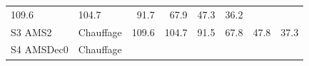 \documentclass[]{article}
\begin{document}
\begin{longtable}[]{@{}llrrrrrr@{}}
\begin{minipage}[t]{0.09\columnwidth}
109.6\strut
\end{minipage} & \begin{minipage}[t]{0.09\columnwidth}\raggedleft\strut
104.7\strut
\end{minipage} & \begin{minipage}[t]{0.09\columnwidth}\raggedleft\strut
91.7\strut
\end{minipage} & \begin{minipage}[t]{0.09\columnwidth}\raggedleft\strut
67.9\strut
\end{minipage} & \begin{minipage}[t]{0.09\columnwidth}\raggedleft\strut
47.3\strut
\end{minipage} & \begin{minipage}[t]{0.09\columnwidth}\raggedleft\strut
36.2\strut
\end{minipage}\tabularnewline
\begin{minipage}[t]{0.14\columnwidth}\raggedright\strut
S3 AMS2\strut
\end{minipage} & \begin{minipage}[t]{0.13\columnwidth}\raggedright\strut
Chauffage\strut
\end{minipage} & \begin{minipage}[t]{0.09\columnwidth}\raggedleft\strut
109.6\strut
\end{minipage} & \begin{minipage}[t]{0.09\columnwidth}\raggedleft\strut
104.7\strut
\end{minipage} & \begin{minipage}[t]{0.09\columnwidth}\raggedleft\strut
91.5\strut
\end{minipage} & \begin{minipage}[t]{0.09\columnwidth}\raggedleft\strut
67.8\strut
\end{minipage} & \begin{minipage}[t]{0.09\columnwidth}\raggedleft\strut
47.8\strut
\end{minipage} & \begin{minipage}[t]{0.09\columnwidth}\raggedleft\strut
37.3\strut
\end{minipage}\tabularnewline
\begin{minipage}[t]{0.14\columnwidth}\raggedright\strut
S4 AMSDec0\strut
\end{minipage} & \begin{minipage}[t]{0.13\columnwidth}\raggedright\strut
Chauffage\strut
\end{minipage} & \begin{minipage}[t]{0.09\columnwidth}\raggedleft\strut

\end{minipage}
\end{longtable}
\end{document}
